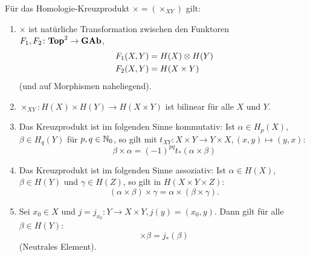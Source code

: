 
\begin{satz}
  Für das Homologie-Kreuzprodukt $\times = (\times_{X Y})$ gilt:
  \begin{enumerate}
    \item
      $\times$ ist natürliche Transformation zwischen den Funktoren $F_1, F_2 \colon \mathbf{Top}^2 \to \mathbf{GAb}$,
      \begin{align*}
        F_1(X,Y) & = H(X) \otimes H(Y) \\
        F_2(X,Y) & = H(X \times Y)
      \end{align*}
      (und auf Morphismen naheliegend).
    \item
      $\times_{XY} \colon H(X) \times H(Y) \to H(X \times Y)$ ist bilinear für alle $X$ und $Y$.
    \item
      Das Kreuzprodukt ist im folgenden Sinne kommutativ:
      Ist $\alpha \in H_p(X)$, $\beta \in H_q(Y)$ für $p,q \in \mathbb{N}_0$, so gilt mit $t_{XY} \colon X \times Y \to Y \times X, (x,y) \mapsto (y,x)$:
      \begin{equation*}
        \beta \times \alpha
         = {(-1)}^{pq} t_* (\alpha \times \beta)
      \end{equation*}
    \item
      Das Kreuzprodukt ist im folgenden Sinne assoziativ:
      Ist $\alpha \in H(X)$, $\beta \in H(Y)$ und $\gamma \in H(Z)$, so gilt in $H(X \times Y \times Z)$:
      \begin{equation*}
        (\alpha \times \beta) \times \gamma = \alpha \times (\beta \times \gamma).
      \end{equation*}
    \item
      Sei $x_0 \in X$ und $j = j_{x_0} \colon Y \to X \times Y, j(y) = (x_0,y)$.
      Dann gilt für alle $\beta \in H(Y)$:
      \begin{equation*}
        [x_0] \times \beta = j_* (\beta)
      \end{equation*}
      (Neutrales Element).
  \end{enumerate}
\end{satz}

